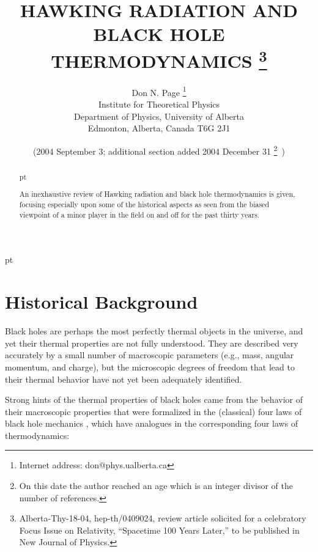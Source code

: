 \documentclass[12pt]{article} \usepackage{latexsym} \textwidth 15cm
\begin{document}
\title{{\bf HAWKING RADIATION AND \\ BLACK HOLE THERMODYNAMICS}
\thanks{Alberta-Thy-18-04, hep-th/0409024, review article solicited for
a celebratory Focus Issue on Relativity, ``Spacetime 100 Years
Later,'' to be published in New Journal of Physics.}}

\author{
Don N. Page
\thanks{Internet address:
don@phys.ualberta.ca}
\\
Institute for Theoretical Physics\\
Department of Physics, University of Alberta\\
Edmonton, Alberta, Canada T6G 2J1
}
\date{(2004 September 3; additional section added 2004 December 31
\thanks{On this date the author reached an age which is an integer
divisor of the number of references.}\ )}
\maketitle
\large

\begin{abstract}

 pt

An inexhaustive review of Hawking radiation and black hole
thermodynamics is given, focusing especially upon some of the
historical aspects as seen from the biased viewpoint of a minor player
in the field on and off for the past thirty years.

\end{abstract}
\normalsize

 pt
\newpage

\section{Historical Background}

Black holes are perhaps the most perfectly thermal objects in the
universe, and yet their thermal properties are not fully understood.
They are described very accurately by a small number of macroscopic
parameters (e.g., mass, angular momentum, and charge), but the
microscopic degrees of freedom that lead to their thermal behavior
have not yet been adequately identified.

Strong hints of the thermal properties of black holes came from the
behavior of their macroscopic properties that were formalized in the
(classical) four laws of black hole mechanics \cite{BCH}, which have
analogues in the corresponding four laws of thermodynamics:
\end{document}
